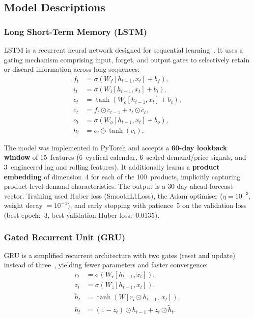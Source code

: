 \documentclass[12pt, a4paper]{article}
\begin{document}
\subsection{Model Descriptions}
\label{subsec:models}

\subsubsection{Long Short-Term Memory (LSTM)}
\label{ssubsec:lstm}

LSTM is a recurrent neural network designed for sequential learning~\cite{hochreiter1997}.
It uses a gating mechanism comprising input, forget, and output gates to selectively retain
or discard information across long sequences:
\begin{align}
    f_t &= \sigma(W_f [h_{t-1}, x_t] + b_f), \label{eq:forget}\\
    i_t &= \sigma(W_i [h_{t-1}, x_t] + b_i), \label{eq:input}\\
    \tilde{c}_t &= \tanh(W_c [h_{t-1}, x_t] + b_c), \label{eq:cell_cand}\\
    c_t &= f_t \odot c_{t-1} + i_t \odot \tilde{c}_t, \label{eq:cell}\\
    o_t &= \sigma(W_o [h_{t-1}, x_t] + b_o), \label{eq:output}\\
    h_t &= o_t \odot \tanh(c_t). \label{eq:hidden}
\end{align}

The model was implemented in PyTorch and accepts a \textbf{60-day lookback window} of
15~features (6~cyclical calendar, 6~scaled demand/price signals, and 3~engineered lag and
rolling features). It additionally learns a \textbf{product embedding} of dimension~4 for
each of the 100~products, implicitly capturing product-level demand characteristics. The
output is a 30-day-ahead forecast vector. Training used Huber loss (SmoothL1Loss), the
Adam optimiser ($\eta = 10^{-3}$, weight decay $= 10^{-4}$), and early stopping with
patience~5 on the validation loss (best epoch:~3, best validation Huber
loss:~0.0135).

\subsubsection{Gated Recurrent Unit (GRU)}
\label{ssubsec:gru}

GRU is a simplified recurrent architecture with two gates (reset and update) instead of
three~\cite{cho2014}, yielding fewer parameters and faster convergence:
\begin{align}
    r_t &= \sigma(W_r [h_{t-1}, x_t]), \label{eq:reset}\\
    z_t &= \sigma(W_z [h_{t-1}, x_t]), \label{eq:update}\\
    \tilde{h}_t &= \tanh(W[r_t \odot h_{t-1},\, x_t]), \label{eq:cand_h}\\
    h_t &= (1 - z_t) \odot h_{t-1} + z_t \odot \tilde{h}_t. \label{eq:gru_h}
\end{align}
\end{document}
